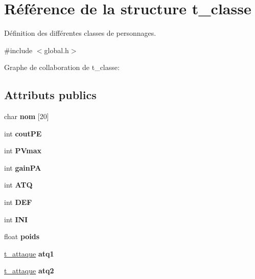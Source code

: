 \hypertarget{a00004}{}\section{Référence de la structure t\+\_\+classe}
\label{a00004}


Définition des différentes classes de personnages.  




{\ttfamily \#include $<$global.\+h$>$}



Graphe de collaboration de t\+\_\+classe\+:
\subsection*{Attributs publics}
\begin{DoxyCompactItemize}
\item 
char {\bfseries nom} \mbox{[}20\mbox{]}\hypertarget{a00004_ab0080d83cb0a2a9ceb8f05dfba32eb99}{}\label{a00004_ab0080d83cb0a2a9ceb8f05dfba32eb99}

\item 
int {\bfseries cout\+PE}\hypertarget{a00004_ac6a9f7551a009405a9fe75130c75ea74}{}\label{a00004_ac6a9f7551a009405a9fe75130c75ea74}

\item 
int {\bfseries P\+Vmax}\hypertarget{a00004_a4694d05e9b9fa7deba7e67dc0c093851}{}\label{a00004_a4694d05e9b9fa7deba7e67dc0c093851}

\item 
int {\bfseries gain\+PA}\hypertarget{a00004_aa2be187b419f9e884889ee3a59a56e8a}{}\label{a00004_aa2be187b419f9e884889ee3a59a56e8a}

\item 
int {\bfseries A\+TQ}\hypertarget{a00004_a13807c477ce6b05bc07fa27d8224c4c0}{}\label{a00004_a13807c477ce6b05bc07fa27d8224c4c0}

\item 
int {\bfseries D\+EF}\hypertarget{a00004_a7557c6f15618a9e93e9f928f6c5181bf}{}\label{a00004_a7557c6f15618a9e93e9f928f6c5181bf}

\item 
int {\bfseries I\+NI}\hypertarget{a00004_a9bc332f2c45ee66f04571b0470a56899}{}\label{a00004_a9bc332f2c45ee66f04571b0470a56899}

\item 
float {\bfseries poids}\hypertarget{a00004_aae98a775f3eec5f23b41616c66b2dcfb}{}\label{a00004_aae98a775f3eec5f23b41616c66b2dcfb}

\item 
\hyperlink{a00003}{t\+\_\+attaque} {\bfseries atq1}\hypertarget{a00004_afee4c531e910b8bd686953747c9ec56c}{}\label{a00004_afee4c531e910b8bd686953747c9ec56c}

\item 
\hyperlink{a00003}{t\+\_\+attaque} {\bfseries atq2}\hypertarget{a00004_aac3cf4fe6b81f0c19e523fc11b6573f3}{}\label{a00004_aac3cf4fe6b81f0c19e523fc11b6573f3}

\end{DoxyCompactItemize}


